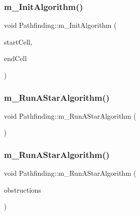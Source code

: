 \mbox{\label{class_pathfinding_a4c5a8788f066f2b91ab52958b211f28d}} 
\subsubsection{\texorpdfstring{m\+\_\+\+Init\+Algorithm()}{m\_InitAlgorithm()}}
{\footnotesize\ttfamily void Pathfinding\+::m\+\_\+\+Init\+Algorithm (\begin{DoxyParamCaption}\item[{\mbox{\hyperlink{class_cells}{Cells}} $\ast$}]{start\+Cell,  }\item[{\mbox{\hyperlink{class_cells}{Cells}} $\ast$}]{end\+Cell }\end{DoxyParamCaption})}

\mbox{\label{class_pathfinding_a423a7763b0990f4143ffcc517ddf2c29}} 
\subsubsection{\texorpdfstring{m\+\_\+\+Run\+A\+Star\+Algorithm()}{m\_RunAStarAlgorithm()}\hspace{0.1cm}{\footnotesize\ttfamily [1/3]}}
{\footnotesize\ttfamily void Pathfinding\+::m\+\_\+\+Run\+A\+Star\+Algorithm (\begin{DoxyParamCaption}{ }\end{DoxyParamCaption})}

\mbox{\label{class_pathfinding_a15896b383f998b1fd8e996b11abfa17a}} 
\subsubsection{\texorpdfstring{m\+\_\+\+Run\+A\+Star\+Algorithm()}{m\_RunAStarAlgorithm()}\hspace{0.1cm}{\footnotesize\ttfamily [2/3]}}
{\footnotesize\ttfamily void Pathfinding\+::m\+\_\+\+Run\+A\+Star\+Algorithm (\begin{DoxyParamCaption}\item[{std\+::vector$<$ \mbox{\hyperlink{_cells_8h_adc5e4636eae42cdad2a070c6adbd9daf}{tile\+Set}} $>$}]{obstructions }\end{DoxyParamCaption})}

